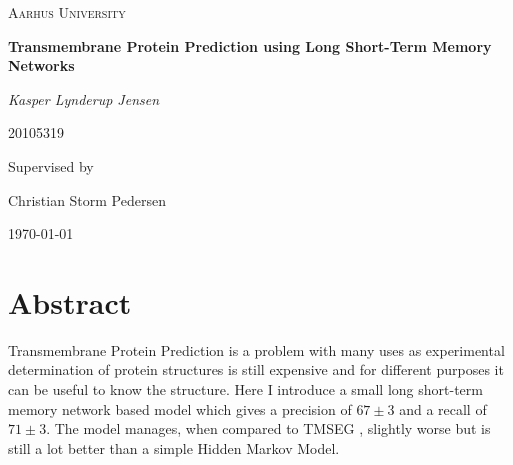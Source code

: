 \documentclass{article}
\begin{document}

\begin{titlepage}
	\centering
	{\scshape\LARGE Aarhus University \par}
	\vspace{1cm}
	{\huge\bfseries Transmembrane Protein Prediction using Long Short-Term Memory Networks\par}
	\vspace{2cm}
	{\Large\itshape Kasper Lynderup Jensen \par}
		20105319\par
	\vfill
	Supervised by\par
	Christian Storm Pedersen
	
	\vfill
	
	{\large \today\par}
\end{titlepage}

\section*{Abstract}
Transmembrane Protein Prediction is a problem with many uses 
as experimental determination of protein structures is still expensive
and for different purposes it can be useful to know the structure.
Here I introduce a small long short-term memory network based model 
which gives a precision of $67 \pm 3$ and a recall of $71 \pm 3$. 
The model manages, when compared to TMSEG \cite{tmseg}, slightly 
worse but is still a lot better than a simple Hidden Markov Model.

\tableofcontents






\end{document}

